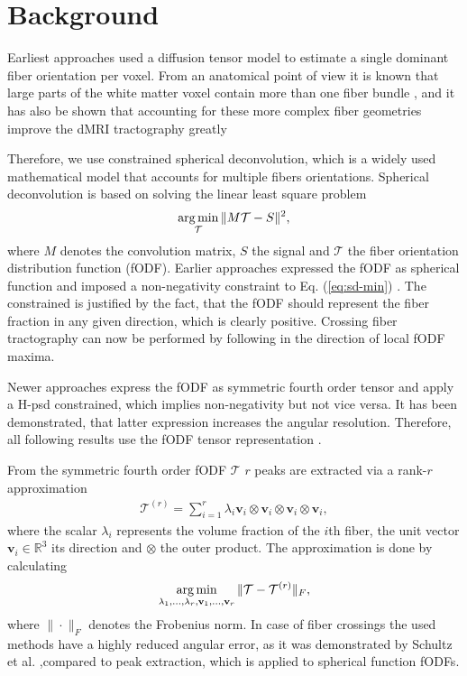 \section{Background}\label{background}
Earliest approaches used a diffusion tensor model
\cite{LeBihan:1986,Mori:1999} to estimate a single dominant fiber orientation
per voxel. From an anatomical point of view it is known that large parts of the
white matter voxel contain more than one fiber bundle \cite{Jeurissen:2012}, and it has also be shown
that accounting for these more complex fiber geometries improve the dMRI
tractography greatly \cite{Neher:2015}

Therefore, we use constrained spherical deconvolution, which is a widely used
mathematical model that accounts for multiple fibers orientations.
Spherical deconvolution is based on solving the linear least square problem 
\begin{align}
	\operatorname*{arg\,min}_{\mathcal{T}} \| M \mathcal{T} - S \|^2,
	\label{eq:sd-min}
\end{align}
where 
$M$ denotes the convolution matrix, $S$ the signal and $\mathcal{T}$ the fiber
orientation distribution function (fODF).
Earlier approaches expressed the fODF as spherical function and imposed a
non-negativity constraint to Eq. (\ref{eq:sd-min}) \cite{TOURNIER20071459}. The constrained is justified by
the fact, that the fODF should represent the fiber fraction in any given
direction, which is clearly positive. Crossing fiber tractography can now be
performed by following in the direction of local fODF maxima.

Newer approaches express the fODF as symmetric fourth order tensor and apply a
H-psd constrained, which implies non-negativity but not vice versa. It has been
demonstrated, that latter expression increases the angular resolution.
Therefore, all following results use the fODF tensor representation
\cite{Ankele:CARS2017}. 

From the symmetric fourth order fODF $\mathcal{T}$ $r$ peaks are extracted via a rank-$r$
approximation 
\begin{align}
	\mathcal{T}^{\left( r \right)} = \sum_{i=1}^r \lambda_i \mathbf{v}_i
	\otimes \mathbf{v}_i \otimes \mathbf{v}_i \otimes \mathbf{v}_i, 
	\label{eq:low-rank}
\end{align}
where the scalar $\lambda_i$ represents the volume fraction of the $i$th fiber,
the unit vector $\mathbf{v}_i \in \mathbb{R}^3$ its direction and $\otimes$ the
outer product. The approximation is done by calculating 
\[ \operatorname*{arg\,min}_{\lambda_1, \dots , \lambda_r , \mathbf{v}_1, \dots , \mathbf{v}_r}
\| \mathcal{T} - \mathcal{T}^{\left( r \right)} \|_F, \]
where $\| \cdot \|_F$ denotes the Frobenius norm. In case of fiber crossings the
used methods have a highly reduced angular error, as it was demonstrated by
Schultz et al. \cite{lowrank},compared to peak extraction, which is applied to spherical function fODFs.

